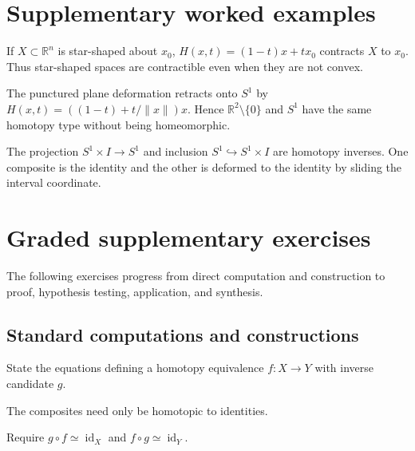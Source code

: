 \section{Supplementary worked examples}
\label{sec:viii02-pedagogy}

\begin{example}\label{ex:viii02-ped-01}
If $X\subset\mathbb R^n$ is star-shaped about $x_0$, $H(x,t)=(1-t)x+tx_0$ contracts $X$ to $x_0$.  Thus star-shaped spaces are contractible even when they are not convex.
\end{example}

\begin{example}\label{ex:viii02-ped-02}
The punctured plane deformation retracts onto $S^1$ by $H(x,t)=((1-t)+t/\|x\|)x$.  Hence $\mathbb R^2\setminus\{0\}$ and $S^1$ have the same homotopy type without being homeomorphic.
\end{example}

\begin{example}\label{ex:viii02-ped-03}
The projection $S^1\times I\to S^1$ and inclusion $S^1\hookrightarrow S^1\times I$ are homotopy inverses.  One composite is the identity and the other is deformed to the identity by sliding the interval coordinate.
\end{example}

\section{Graded supplementary exercises}
The following exercises progress from direct computation and construction to proof, hypothesis testing, application, and synthesis.

\subsection*{Standard computations and constructions}

\begin{exercise}\label{exr:viii02-ped-01}
State the equations defining a homotopy equivalence $f:X\to Y$ with inverse candidate $g$.
\end{exercise}
\begin{hint}
The composites need only be homotopic to identities.
\end{hint}
\begin{solution}
Require $g\circ f\simeq\operatorname{id}_X$ and $f\circ g\simeq\operatorname{id}_Y$.
\end{solution}

